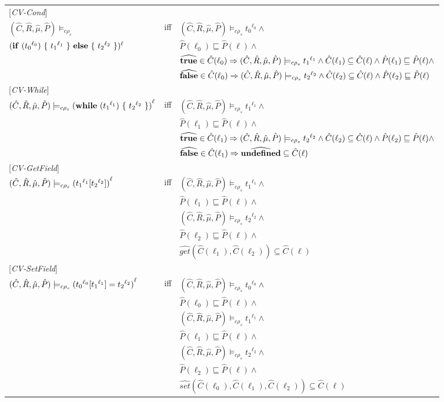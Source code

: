 \documentclass[[12pt,a4paper,twoside,openrigh]{article}
\newcommand{\Cat}[0]{\hat{C}}
\newcommand{\muat}[0]{\hat{\mu}}
\newcommand{\Rat}[0]{\hat{R}}
\newcommand{\Pat}[0]{\hat{P}}
\newcommand{\cenvs}{(\Cat,\Rat,\muat,\Pat)}
\newcommand{\ccest}[1]{\cenvs \models_{c \rho_s} #1}
\newcommand{\ccestl}[1]{\cenvs \models_{c \rho_s} {(#1)}^{\ell}}
\newcommand{\lbt}[1]{{t_#1}^{\ell_#1}}
\begin{document}
\begin{tabular}{l l l}
{[\textit{CV-Cond}]}\\
$\cenvs \models_{c \rho_s} $& iff &$ \ccest {\lbt 0} \wedge $\\
$(\cond {\lbt 0} {\lbt 1} {\lbt 2})^\ell$&& $\Pat(\ell_0) \sqsubseteq \Pat(\ell) \wedge$ \\
&& $\widehat{\true} \in \Cat(\ell_0) \Rightarrow \ccest {\lbt 1} \wedge \Cat(\ell_1) \subseteq \Cat(\ell) \wedge \Pat(\ell_1) \sqsubseteq \Pat(\ell) \wedge$ \\
&& $\widehat{\false} \in \Cat(\ell_0) \Rightarrow \ccest {\lbt 2} \wedge \Cat(\ell_2) \subseteq \Cat(\ell) \wedge \Pat(\ell_2) \sqsubseteq \Pat(\ell)$ \\
{[\textit{CV-While}]}\\
$\ccestl {\while {\lbt 1} {\lbt 2}} $& iff &$ \ccest {\lbt 1} \wedge $\\
&& $\Pat(\ell_1) \sqsubseteq \Pat(\ell) \wedge$ \\
&& $\widehat{\true} \in \Cat(\ell_1) \Rightarrow \ccest {\lbt 2} \wedge \Cat(\ell_2) \subseteq \Cat(\ell) \wedge \Pat(\ell_2) \sqsubseteq \Pat(\ell) \wedge$\\
&& $\widehat{\false} \in \Cat(\ell_1) \Rightarrow \widehat{\undef} \subseteq \Cat(\ell)$\\
{[\textit{CV-GetField}]}\\
$\ccestl {\lookup {\lbt 1} {\lbt 2}} $& iff &$ \ccest {\lbt1} \wedge $\\
&& $\Pat(\ell_1) \sqsubseteq \Pat(\ell) \wedge$ \\
&& $ \ccest {\lbt 2} \wedge $ \\
&& $\Pat(\ell_2) \sqsubseteq \Pat(\ell) \wedge$ \\
&& $\widehat{get} (\Cat(\ell_1), \Cat(\ell_2)) \subseteq \Cat(\ell)$ \\
{[\textit{CV-SetField}]}\\
$\ccestl {\store {\lbt 0} {\lbt 1} {\lbt 2}} $& iff &$ \ccest {\lbt 0} \wedge $\\
&& $\Pat(\ell_0) \sqsubseteq \Pat(\ell) \wedge$ \\
&& $ \ccest {\lbt 1} \wedge $ \\
&& $\Pat(\ell_1) \sqsubseteq \Pat(\ell) \wedge$ \\
&& $ \ccest {\lbt 2} \wedge $ \\
&& $\Pat(\ell_2) \sqsubseteq \Pat(\ell) \wedge$ \\
&& $\widehat{set} (\Cat(\ell_0), \Cat(\ell_1), \Cat(\ell_2)) \subseteq \Cat(\ell)$ \\
\end{tabular}
\end{document}
